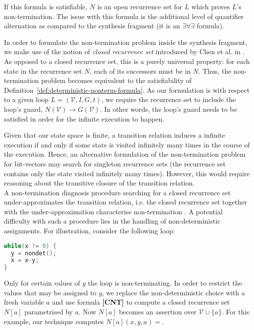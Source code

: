 \documentclass[preprint]{sigplanconf}
\theoremstyle{definition}
\begin{document}
If this formula is satisfiable, $N$ is an open recurrence set for $L$ which proves
$L$'s non-termination. The issue with this formula is the additional level of quantifier alternation as compared to the synthesis fragment
(it is an $\exists \forall \exists$ formula). %

In order to formulate the non-termination problem inside the synthesis fragment, 
we make use of the notion of \emph{closed recurrence set} introduced by Chen et al. in \cite{DBLP:conf/tacas/ChenCFNO14}. 
As opposed to a closed recurrence set, this is a  purely universal property: for each state in the recurrence set $N$, each of its successors 
must be in $N$. Thus, the non-termination problem becomes equivalent to the
satisfiability of Definition~\ref{def:deterministic-nonterm-formula}.
As our formulation is with respect to a given loop $L=(\mathcal{V},I,G,t)$, we require the  
recurrence set to include the loop's guard, $N(\mathcal{V}) \rightarrow G(\mathcal{V})$. In other words, the loop's guard needs to be satisfied in order for the 
infinite execution to happen.

Given that our state space is finite, a transition relation induces a infinite execution if and only if some state is 
visited infinitely many times in the course of the execution. Hence, an alternative formulation of the non-termination problem 
for bit-vectors may search for singleton recurrence sets (the recurrence set contains only the state visited infinitely many times).
However, this would require reasoning about the transitive closure of the transition relation.\\

 A non-termination diagnosis procedure searching for a closed recurrence set under-approximates the transition relation, i.e. 
the closed recurrence set together with the under-approximation characterise non-termination \cite{DBLP:conf/tacas/ChenCFNO14}.
A potential difficulty with such a procedure lies in the handling of non-deterministic assignments. For illustration, consider the following loop:

\begin{lstlisting}[language=C]
while(x != 0) {
  y = nondet();
  x = x-y;
}
\end{lstlisting}

Only for certain values of $y$ the loop is non-terminating.
In order to restrict the values that may be assigned to $y$, we replace the non-deterministic choice with a fresh variable $a$ and use formula {\bf [CNT]}
to compute a closed recurrence set $N[a]$ parametrised by $a$. Now $N[a]$ becomes an assertion over $\mathcal{V} \cup \{a\}$.
For this example, our technique computes $N[a](x,y,a) = $.%
\end{document}
